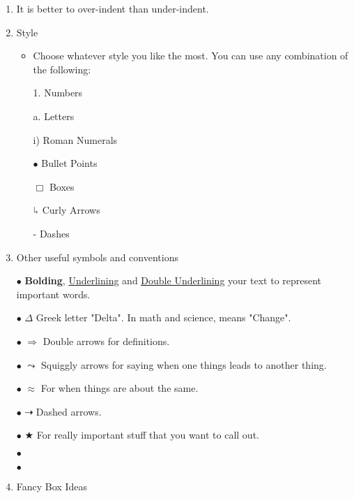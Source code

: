 \documentclass[../../Main/main.tex]{subfiles}
\begin{document}
\begin{enumerate}
	\item It is better to over-indent than under-indent.

	\item Style
	      \begin{itemize}
		      \item Choose whatever style you like the most.  You can use any combination of the following:
		            \begin{displayquote}

			            1. Numbers

			            \quad a. Letters

			            \quad \quad i) Roman Numerals

			            \quad \(\bullet\) Bullet Points

			            \quad \quad $\Box$ Boxes

			            \quad $\rotatebox[origin=c]{180}{$\Lsh$}$ Curly Arrows

			            \quad \quad - Dashes
		            \end{displayquote}
	      \end{itemize}

	\item Other useful symbols and conventions

	      $\bullet$ \quad \textbf{Bolding}, \underline{Underlining} and \underline{\underline{Double Underlining}} your text to represent important words.

	      $\bullet$ \quad $\Delta$ Greek letter "Delta".  In math and science, means "Change".

	      $\bullet$ \quad $\Rightarrow$ Double arrows for definitions.

	      $\bullet$ \quad $\leadsto$ Squiggly arrows for saying when one things leads to another thing.

	      $\bullet$ \quad $\approx$ For when things are about the same.

	      $\bullet$ \quad $\dashrightarrow$ Dashed arrows.

	      $\bullet$ \quad $\bigstar$ For really important stuff that you want to call out.

	      $\bullet$ \quad {}

	      $\bullet$ \quad {}

	\item Fancy Box Ideas


\end{enumerate}
\end{document}
